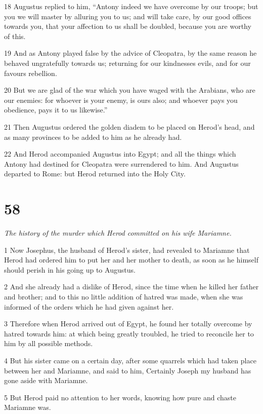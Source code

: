 18 Augustus replied to him, “Antony indeed we have overcome by our troops; but you we will master by alluring you to us; and will take care, by our good offices towards you, that your affection to us shall be doubled, because you are worthy of this. 

19 And as Antony played false by the advice of Cleopatra, by the same reason he behaved ungratefully towards us; returning for our kindnesses evils, and for our favours rebellion. 

20 But we are glad of the war which you have waged with the Arabians, who are our enemies: for whoever is your enemy, is ours also; and whoever pays you obedience, pays it to us likewise.” 

21 Then Augustus ordered the golden diadem to be placed on Herod’s head, and as many provinces to be added to him as he already had. 

22 And Herod accompanied Augustus into Egypt; and all the things which Antony had destined for Cleopatra were surrendered to him. And Augustus departed to Rome: but Herod returned into the Holy City.

\chapter{58}

\par \textit{The history of the murder which Herod committed on his wife Mariamne.}

1 Now Josephus, the husband of Herod’s sister, had revealed to Mariamne that Herod had ordered him to put her and her mother to death, as soon as he himself should perish in his going up to Augustus. 

2 And she already had a dislike of Herod, since the time when he killed her father and brother; and to this no little addition of hatred was made, when she was informed of the orders which he had given against her. 

3 Therefore when Herod arrived out of Egypt, he found her totally overcome by hatred towards him: at which being greatly troubled, he tried to reconcile her to him by all possible methods. 

4 But his sister came on a certain day, after some quarrels which had taken place between her and Mariamne, and said to him, Certainly Joseph my husband has gone aside with Mariamne. 

5 But Herod paid no attention to her words, knowing how pure and chaste Mariamne was. 

